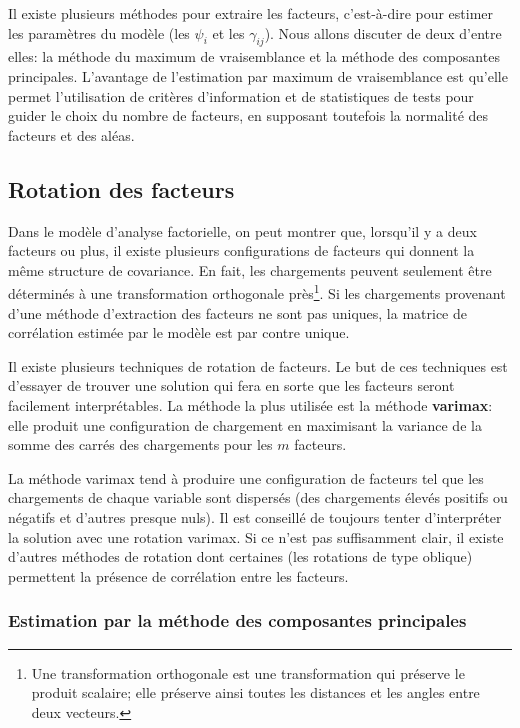 \documentclass[
  11pt,
  letterpaper,
]{scrbook}
\theoremstyle{definition}
\theoremstyle{remark}
\begin{document}
Il existe plusieurs méthodes pour extraire les facteurs, c'est-à-dire
pour estimer les paramètres du modèle (les \(\psi_i\) et les
\(\gamma_{ij}\)). Nous allons discuter de deux d'entre elles: la méthode
du maximum de vraisemblance et la méthode des composantes principales.
L'avantage de l'estimation par maximum de vraisemblance est qu'elle
permet l'utilisation de critères d'information et de statistiques de
tests pour guider le choix du nombre de facteurs, en supposant toutefois
la normalité des facteurs et des aléas.

\hypertarget{rotation-des-facteurs}{%
\subsection{Rotation des facteurs}\label{rotation-des-facteurs}}

Dans le modèle d'analyse factorielle, on peut montrer que, lorsqu'il y a
deux facteurs ou plus, il existe plusieurs configurations de facteurs
qui donnent la même structure de covariance. En fait, les chargements
peuvent seulement être déterminés à une transformation orthogonale
près\footnote{Une transformation orthogonale est une transformation qui
  préserve le produit scalaire; elle préserve ainsi toutes les distances
  et les angles entre deux vecteurs.}. Si les chargements provenant
d'une méthode d'extraction des facteurs ne sont pas uniques, la matrice
de corrélation estimée par le modèle est par contre unique.

Il existe plusieurs techniques de rotation de facteurs. Le but de ces
techniques est d'essayer de trouver une solution qui fera en sorte que
les facteurs seront facilement interprétables. La méthode la plus
utilisée est la méthode \textbf{varimax}: elle produit une configuration
de chargement en maximisant la variance de la somme des carrés des
chargements pour les \(m\) facteurs.

La méthode varimax tend à produire une configuration de facteurs tel que
les chargements de chaque variable sont dispersés (des chargements
élevés positifs ou négatifs et d'autres presque nuls). Il est conseillé
de toujours tenter d'interpréter la solution avec une rotation varimax.
Si ce n'est pas suffisamment clair, il existe d'autres méthodes de
rotation dont certaines (les rotations de type oblique) permettent la
présence de corrélation entre les facteurs.

\hypertarget{estimation-par-la-muxe9thode-des-composantes-principales}{%
\subsubsection{Estimation par la méthode des composantes
principales}\label{estimation-par-la-muxe9thode-des-composantes-principales}}
\end{document}
